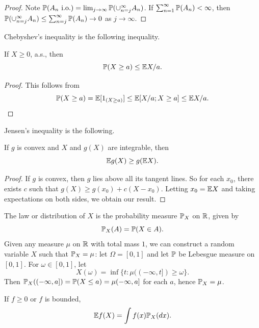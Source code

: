 \begin{proof}
Note $\P(A_n~\text{i.o.}) = \lim_{j\to\infty} \P(\cup_{n=j}^{\infty} A_n)$. If $\sum_{n=1}^{\infty} \P(A_n) < \infty$, then $\P(\cup_{n=j}^{\infty} A_n) \leq \sum_{n=j}^{\infty} \P(A_n) \to 0$ as $j \to \infty$.
\end{proof}


Chebyshev's inequality is the following inequality.

\begin{proposition}\label{prop:ch1_1.2}
If $X \geq 0$, a.s., then
\[
    \P(X \geq a) \leq \E X/a.
\]
\end{proposition}

\begin{proof}
This follows from
\[
    \P(X \geq a) = \E[1_{(X\geq a)}] \leq \E[X/a; X \geq a] \leq \E X/a.
\]
\end{proof}

Jensen's inequality is the following.

\begin{proposition}\label{prop:ch1_1.3}
If $g$ is convex and $X$ and $g(X)$ are integrable, then
\[
    \E g(X) \geq g(\E X).
\]
\end{proposition}

\begin{proof}
If $g$ is convex, then $g$ lies above all its tangent lines. So for each $x_0$, there exists $c$ such that $g(X) \geq g(x_0) + c(X - x_0)$. Letting $x_0 = \E X$ and taking expectations on both sides, we obtain our result.
\end{proof}

The law or distribution of $X$ is the probability measure $\P_X$ on $\R$, given by
\begin{equation}\label{eq:ch1_1.1}
    \P_X(A) = \P(X \in A).
\end{equation}
Given any measure $\mu$ on $\R$ with total mass $1$, we can construct a random variable $X$ such that $\P_X = \mu$: let $\Omega = [0,1]$ and let $\P$ be Lebesgue measure on $[0,1]$. For $\omega \in [0,1]$, let
\begin{equation}\label{eq:ch1_1.2}
    X(\omega) = \inf\{t : \mu((-\infty,t]) \geq \omega\}.
\end{equation}
Then $\P_X((-\infty,a]) = \P(X \leq a) = \mu(-\infty,a]$ for each $a$, hence $\P_X = \mu$.

\begin{proposition}\label{prop:ch1_1.4}
If $f \geq 0$ or $f$ is bounded,
\[
    \E f(X) = \int f(x)\P_X(dx).
\]
\end{proposition}

